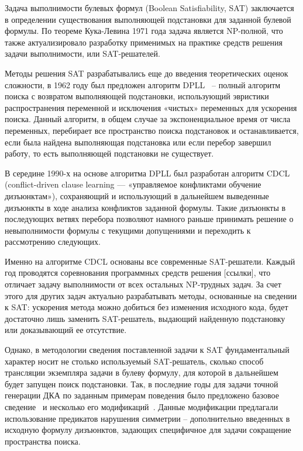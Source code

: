 Задача выполнимости булевых формул (Boolean Satisfiability, SAT) заключается в определении существования выполняющей подстановки для заданной булевой формулы. По теореме Кука-Левина 1971 года задача является NP-полной, что также актуализировало разработку применимых на практике средств решения задачи выполнимости, или SAT-решателей.

Методы решения SAT разрабатывались еще до введения теоретических оценок сложности, в 1962 году был предложен алгоритм DPLL~\cite{DBLP:journals/cacm/DavisLL62} – полный алгоритм поиска с возвратом выполняющей подстановки, использующий эвристики распространения переменной и исключения «чистых» переменных для ускорения поиска. Данный алгоритм, в общем случае за экспоненциальное время от числа переменных, перебирает все пространство поиска подстановок и останавливается, если была найдена выполняющая подстановка или если перебор завершил работу, то есть выполняющей подстановки не существует. 

В середине 1990-х на основе алгоритма DPLL был разработан алгоритм CDCL~\cite{DBLP:conf/iccad/SilvaS96} (conflict-driven clause learning — «управляемое конфликтами обучение дизъюнктам»), сохраняющий  и использующий в дальнейшем выведенные дизъюнкты в ходе анализа конфликтов заданной формулы. Такие дизъюнкты в последующих ветвях перебора позволяют намного раньше принимать решение о невыполнимости формулы с текущими допущениями и переходить к рассмотрению следующих.

Именно на алгоритме CDCL основаны все современные SAT-решатели. Каждый год проводятся соревнования программных средств решения [ссылки], что отличает задачу выполнимости от всех остальных NP-трудных задач. За счет этого для других задач актуально разрабатывать методы, основанные на сведении к SAT: ускорения метода можно добиться без изменения исходного кода, будет достаточно лишь заменить SAT-решатель, выдающий найденную подстановку или доказывающий ее отсутствие.

Однако, в методологии сведения поставленной задачи к SAT фундаментальный характер носит не столько используемый SAT-решатель, сколько способ трансляции экземпляра задачи в булеву формулу, для которой в дальнейшем будет запущен поиск подстановки. Так, в последние годы для задачи точной генерации ДКА по заданным примерам поведения было предложено базовое сведение~\cite{heule-icgi10} и несколько его модификаций~\cite{DBLP:journals/ese/HeuleV13,ulyantsev-phd-13}. Данные модификации предлагали использование предикатов нарушения симметрии – дополнительно введенных в исходную формулу дизъюнктов, задающих специфичное для задачи сокращение пространства поиска.

